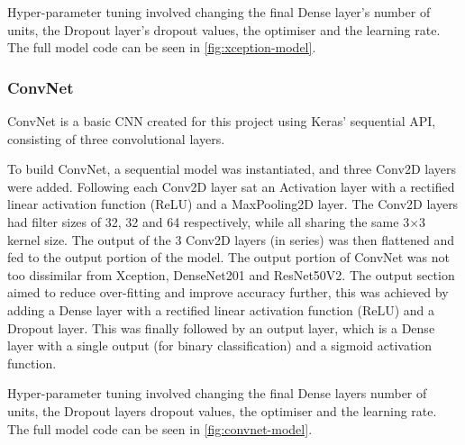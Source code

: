 Hyper-parameter tuning involved changing the final Dense layer's number of units, the Dropout layer's dropout values, the optimiser and the learning rate. The full model code can be seen in \autoref{fig:xception-model}.

\subsubsection{ConvNet}
ConvNet is a basic CNN created for this project using Keras' sequential API, consisting of three convolutional layers.

To build ConvNet, a sequential model was instantiated, and three Conv2D layers were added. Following each Conv2D layer sat an Activation layer with a rectified linear activation function (ReLU) and a MaxPooling2D layer. The Conv2D layers had filter sizes of 32, 32 and 64 respectively, while all sharing the same 3$\times$3 kernel size. The output of the 3 Conv2D layers (in series) was then flattened and fed to the output portion of the model. The output portion of ConvNet was not too dissimilar from Xception, DenseNet201 and ResNet50V2. The output section aimed to reduce over-fitting and improve accuracy further, this was achieved by adding a Dense layer with a rectified linear activation function (ReLU) and a Dropout layer. This was finally followed by an output layer, which is a Dense layer with a single output (for binary classification) and a sigmoid activation function.

Hyper-parameter tuning involved changing the final Dense layers number of units, the Dropout layers dropout values, the optimiser and the learning rate. The full model code can be seen in \autoref{fig:convnet-model}.


